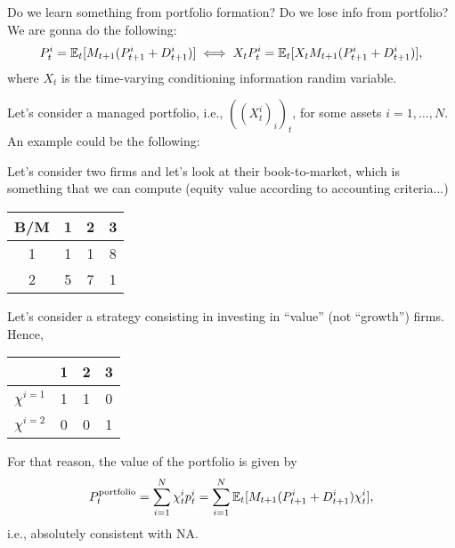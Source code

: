 Do we learn something from portfolio formation? Do we lose info from portfolio? We are gonna do the following:
$$
	\begin{aligned}
	 P_t^i = \mathbb{E}_t[M_{t+1}(P_{t+1}^i + D_{t+1}^i)]\iff X_t P_t^i = \mathbb{E}_t[X_t M_{t+1}(P_{t+1}^i + D_{t+1}^i)],
	\end{aligned}
$$
where $X_t$ is the time-varying conditioning information randim variable.

Let's consider a managed portfolio, i.e., $((X_t^i)_i)_t$, for some assets $i=1,\ldots, N$. An example could be the following:

Let's consider two firms and let's look at their book-to-market, which is something that we can compute (equity value according to accounting criteria...)
\begin{table}[h!]
	\centering
	\begin{tabular}{c||ccc}\hline
		B/M & 1 & 2 & 3\\\hline\hline
		1 & 1 & 1 & 8\\\hline
		2 & 5 & 7 & 1\\\hline
	\end{tabular}
\end{table}
Let's consider a strategy consisting in investing in ``value'' (not ``growth'') firms. Hence, 
\begin{table}[h!]
	\centering
	\begin{tabular}{c||ccc}\hline
		 &1 & 2 & 3\\\hline\hline
		$\chi^{i=1}$ & 1 & 1 & 0\\\hline
		$\chi^{i=2}$ &0 & 0 & 1\\\hline
	\end{tabular}
\end{table}
For that reason, the value of the portfolio is given by
$$
	P_t^{\text{portfolio}} = \sum_{i=1}^N\chi_t^i p_t^i = \sum_{i=1}^N \mathbb{E}_t[M_{t+1}(P_{t+1}^i + D_{t+1}^i)\chi_t^i],
$$
i.e., absolutely consistent with NA.